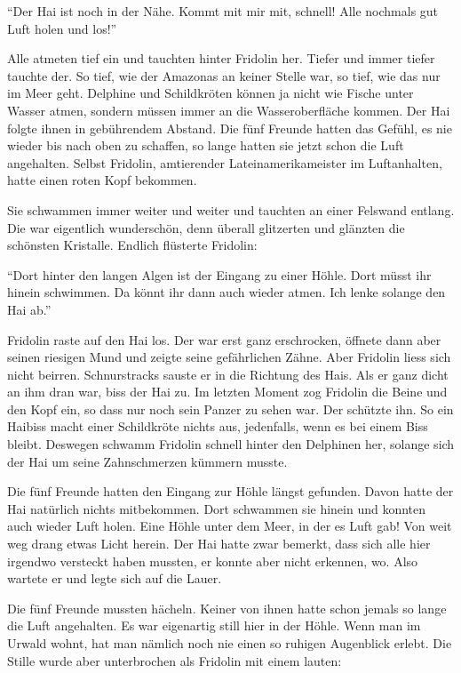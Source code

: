 \enquote{Der Hai ist noch in der Nähe. Kommt mit mir mit, schnell! Alle nochmals gut Luft holen und los!}

Alle atmeten tief ein und tauchten hinter Fridolin her. Tiefer und immer tiefer tauchte der. So tief, wie der Amazonas an keiner Stelle war, so tief, wie das nur im Meer geht. Delphine und Schildkröten können ja nicht wie Fische unter Wasser atmen, sondern müssen immer an die Wasseroberfläche kommen. Der Hai folgte ihnen in gebührendem Abstand. Die fünf Freunde hatten das Gefühl, es nie wieder bis nach oben zu schaffen, so lange hatten sie jetzt schon die Luft angehalten. Selbst Fridolin, amtierender Lateinamerikameister im Luftanhalten, hatte einen roten Kopf bekommen. 

Sie schwammen immer weiter und weiter und tauchten an einer Felswand entlang. Die war eigentlich wunderschön, denn überall glitzerten und glänzten die schönsten Kristalle. Endlich flüsterte Fridolin:

\enquote{Dort hinter den langen Algen ist der Eingang zu einer Höhle. Dort müsst ihr hinein schwimmen. Da könnt ihr dann auch wieder atmen. Ich lenke solange den Hai ab.}

Fridolin raste auf den Hai los. Der war erst ganz erschrocken, öffnete dann aber seinen riesigen Mund und zeigte seine gefährlichen Zähne. Aber Fridolin liess sich nicht beirren. Schnurstracks sauste er in die Richtung des Hais. Als er ganz dicht an ihm dran war, biss der Hai zu. Im letzten Moment zog Fridolin die Beine und den Kopf ein, so dass nur noch sein Panzer zu sehen war. Der schützte ihn. So ein Haibiss macht einer Schildkröte nichts aus, jedenfalls, wenn es bei einem Biss bleibt. Deswegen schwamm Fridolin schnell hinter den Delphinen her, solange sich der Hai um seine Zahnschmerzen kümmern musste.

Die fünf Freunde hatten den Eingang zur Höhle längst gefunden. Davon hatte der Hai natürlich nichts mitbekommen. Dort schwammen sie hinein und konnten auch wieder Luft holen. Eine Höhle unter dem Meer, in der es Luft gab! Von weit weg drang etwas Licht herein. Der Hai hatte zwar bemerkt, dass sich alle hier irgendwo versteckt haben mussten, er konnte aber nicht erkennen, wo. Also wartete er und legte sich auf die Lauer.

Die fünf Freunde mussten hächeln. Keiner von ihnen hatte schon jemals so lange die Luft angehalten. Es war eigenartig still hier in der Höhle. Wenn man im Urwald wohnt, hat man nämlich noch nie einen so ruhigen Augenblick erlebt. Die Stille wurde aber unterbrochen als Fridolin mit einem lauten: 


